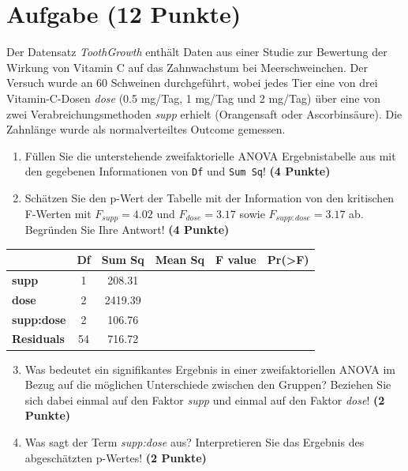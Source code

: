 \documentclass[a4paper, 10pt]{scrartcl}\usepackage[]{graphicx}\usepackage[]{xcolor}
\begin{document}
 
\clearpage

\section{Aufgabe \hfill (12 Punkte)}

Der Datensatz \textit{ToothGrowth} enth{\"a}lt Daten aus einer Studie zur
Bewertung der Wirkung von Vitamin C auf das Zahnwachstum bei
Meerschweinchen. Der Versuch wurde an 60 Schweinen durchgef{\"u}hrt, wobei
jedes Tier eine von drei Vitamin-C-Dosen \textit{dose} (0.5 mg/Tag, 1
mg/Tag und 2 mg/Tag) {\"u}ber eine von zwei Verabreichungsmethoden
\textit{supp} erhielt (Orangensaft oder Ascorbins{\"a}ure). Die Zahnl{\"a}nge wurde
als normalverteiltes Outcome gemessen.



\begin{enumerate}
\item F{\"u}llen Sie die unterstehende zweifaktorielle ANOVA Ergebnistabelle aus
  mit den gegebenen Informationen von \texttt{Df} und \texttt{Sum Sq}!
  \textbf{(4 Punkte)}
\item Sch{\"a}tzen Sie den p-Wert der Tabelle mit der Information von den
  kritischen F-Werten mit
  $F_{supp} = 4.02$ und
  $F_{dose} = 3.17$ sowie
  $F_{supp:dose} = 3.17$ ab. Begr{\"u}nden Sie Ihre
  Antwort! \textbf{(4 Punkte)}
\end{enumerate}

\vspace{1Ex}

\begin{center}
  \Large
  \begin{tabular}{l|c|c|c|c|c}
     & \textbf{Df} & \textbf{Sum Sq} & \textbf{Mean Sq} & \textbf{F value} & \textbf{Pr(>F)} \strut\\
    \hline
   \textbf{supp}  & 1 & 208.31 &  &  &  \strut\\
    \hline
    \textbf{dose}  & 2 & 2419.39 &  &  &  \strut\\
    \hline
    \textbf{supp:dose}  & 2 & 106.76 &  &  &  \strut\\
    \hline
   \textbf{Residuals}  & 54 & 716.72 &  &  &  \strut\\
  \end{tabular}
\end{center}

\vspace{1Ex}

\begin{enumerate}
  \setcounter{enumi}{2}
\item Was bedeutet ein signifikantes Ergebnis in einer zweifaktoriellen
  ANOVA im Bezug auf die m{\"o}glichen Unterschiede zwischen den Gruppen?
  Beziehen Sie sich dabei einmal auf den Faktor \textit{supp} und einmal
  auf den Faktor \textit{dose}! \textbf{(2 Punkte)}
\item Was sagt der Term \textit{supp:dose} aus? Interpretieren Sie das
  Ergebnis des abgesch{\"a}tzten p-Wertes! \textbf{(2 Punkte)}
\end{enumerate}
 
\end{document}
